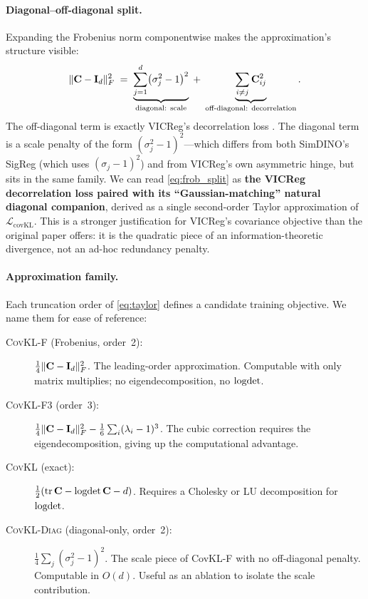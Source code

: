 \paragraph{Diagonal--off-diagonal split.}
Expanding the Frobenius norm componentwise makes the approximation's structure visible:
\begin{equation}
\label{eq:frob_split}
    \|\mathbf{C} - \mathbf{I}_d\|_F^2 \;=\; \underbrace{\sum_{j=1}^{d}\bigl(\sigma_j^2 - 1\bigr)^2}_{\text{diagonal: scale}} \;+\; \underbrace{\sum_{i \ne j} \mathbf{C}_{ij}^2}_{\text{off-diagonal: decorrelation}}.
\end{equation}
The off-diagonal term is exactly VICReg's decorrelation loss \citep{bardes2022vicreg}. The diagonal term is a scale penalty of the form $(\sigma_j^2 - 1)^2$---which differs from both SimDINO's SigReg (which uses $(\sigma_j - 1)^2$) and from VICReg's own asymmetric hinge, but sits in the same family. We can read \eqref{eq:frob_split} as \textbf{the VICReg decorrelation loss paired with its ``Gaussian-matching'' natural diagonal companion}, derived as a single second-order Taylor approximation of $\mathcal{L}_\text{covKL}$. This is a stronger justification for VICReg's covariance objective than the original paper offers: it is the quadratic piece of an information-theoretic divergence, not an ad-hoc redundancy penalty.

\paragraph{Approximation family.}
Each truncation order of \eqref{eq:taylor} defines a candidate training objective. We name them for ease of reference:
\begin{description}
    \item[\textsc{CovKL-F} (Frobenius, order~2):] $\tfrac{1}{4}\|\mathbf{C} - \mathbf{I}_d\|_F^2$. The leading-order approximation. Computable with only matrix multiplies; no eigendecomposition, no $\operatorname{logdet}$.
    \item[\textsc{CovKL-F3} (order~3):] $\tfrac{1}{4}\|\mathbf{C} - \mathbf{I}_d\|_F^2 - \tfrac{1}{6}\sum_i(\lambda_i - 1)^3$. The cubic correction requires the eigendecomposition, giving up the computational advantage.
    \item[\textsc{CovKL} (exact):] $\tfrac{1}{2}(\operatorname{tr}\mathbf{C} - \operatorname{logdet}\mathbf{C} - d)$. Requires a Cholesky or LU decomposition for $\operatorname{logdet}$.
    \item[\textsc{CovKL-Diag} (diagonal-only, order~2):] $\tfrac{1}{4}\sum_j(\sigma_j^2 - 1)^2$. The scale piece of CovKL-F with no off-diagonal penalty. Computable in $O(d)$. Useful as an ablation to isolate the scale contribution.
\end{description}

